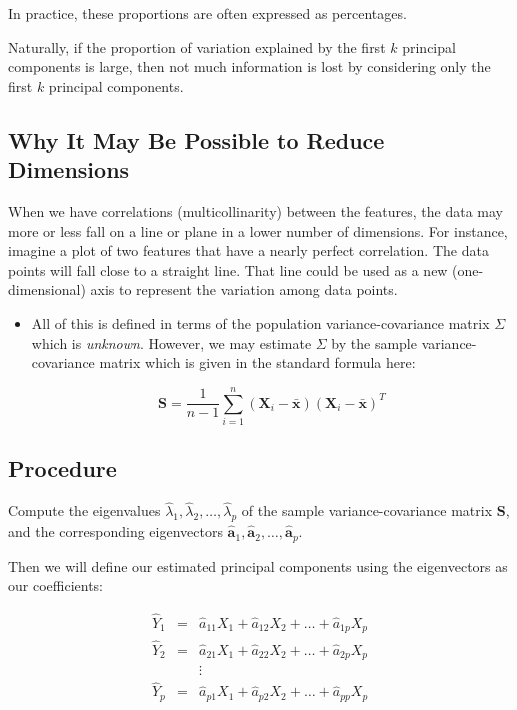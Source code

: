 \documentclass[]{book}
\newenvironment{rmdblock}[1]
  {\begin{shaded*}
  \begin{itemize}
  \renewcommand{\labelitemi}{
    \raisebox{-.7\height}[0pt][0pt]{
      {\setkeys{Gin}{width=2em,keepaspectratio}\texttt{[image: img/icons/\#1]}}
    }
  }
  \item
  }
  {
  \end{itemize}
  \end{shaded*}
  }
\newenvironment{rmdcaution}
  {\begin{rmdblock}{caution}}
  {\end{rmdblock}}
\begin{document}
In practice, these proportions are often expressed as percentages.

Naturally, if the proportion of variation explained by the first \(k\)
principal components is large, then not much information is lost by
considering only the first \(k\) principal components.

\subsection*{Why It May Be Possible to Reduce
Dimensions}\label{why-it-may-be-possible-to-reduce-dimensions}

When we have correlations (multicollinarity) between the features, the
data may more or less fall on a line or plane in a lower number of
dimensions. For instance, imagine a plot of two features that have a
nearly perfect correlation. The data points will fall close to a
straight line. That line could be used as a new (one-dimensional) axis
to represent the variation among data points.

\begin{rmdcaution}
All of this is defined in terms of the population variance-covariance
matrix \(\Sigma\) which is \emph{unknown}. However, we may estimate
\(\Sigma\) by the sample variance-covariance matrix which is given in
the standard formula here:

\[ \textbf{S} = \frac{1}{n-1} \sum_{i=1}^{n}(\mathbf{X}_i-\bar{\textbf{x}})(\mathbf{X}_i-\bar{\textbf{x}})^T \]
\end{rmdcaution}

\subsection*{Procedure}\label{procedure}

Compute the eigenvalues
\(\hat{\lambda}_1, \hat{\lambda}_2, \dots, \hat{\lambda}_p\) of the
sample variance-covariance matrix \(\textbf{S}\), and the corresponding
eigenvectors
\(\hat{\mathbf{a}}_1, \hat{\mathbf{a}}_2, \dots, \hat{\mathbf{a}}_p\).

Then we will define our estimated principal components using the
eigenvectors as our coefficients:

\[ \begin{array}{lll} \hat{Y}_1 & = & \hat{a}_{11}X_1 + \hat{a}_{12}X_2 + \dots + \hat{a}_{1p}X_p \\ \hat{Y}_2 & = & \hat{a}_{21}X_1 + \hat{a}_{22}X_2 + \dots + \hat{a}_{2p}X_p \\&&\vdots\\ \hat{Y}_p & = & \hat{a}_{p1}X_1 + \hat{a}_{p2}X_2 + \dots + \hat{a}_{pp}X_p \\ \end{array} \]
\end{document}
